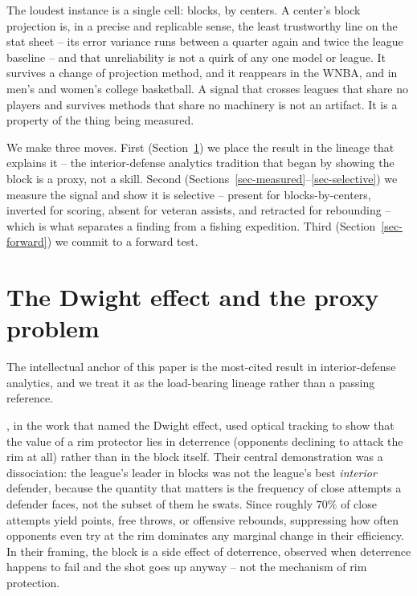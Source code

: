 \documentclass[11pt]{article}
\begin{document}
The loudest instance is a single cell: blocks, by centers. A center's block projection is, in a precise and replicable sense, the least trustworthy line on the stat sheet -- its error variance runs between a quarter again and twice the league baseline -- and that unreliability is not a quirk of any one model or league. It survives a change of projection method, and it reappears in the WNBA, and in men's and women's college basketball. A signal that crosses leagues that share no players and survives methods that share no machinery is not an artifact. It is a property of the thing being measured.

We make three moves. First (Section~\ref{sec-dwight}) we place the result in the lineage that explains it -- the interior-defense analytics tradition that began by showing the block is a proxy, not a skill. Second (Sections~\ref{sec-measured}--\ref{sec-selective}) we measure the signal and show it is selective -- present for blocks-by-centers, inverted for scoring, absent for veteran assists, and retracted for rebounding -- which is what separates a finding from a fishing expedition. Third (Section~\ref{sec-forward}) we commit to a forward test.

\section{The Dwight effect and the proxy problem}\label{sec-dwight}
The intellectual anchor of this paper is the most-cited result in interior-defense analytics, and we treat it as the load-bearing lineage rather than a passing reference.

\citet{goldsberry2013dwight}, in the work that named the Dwight effect, used optical tracking to show that the value of a rim protector lies in deterrence (opponents declining to attack the rim at all) rather than in the block itself. Their central demonstration was a dissociation: the league's leader in blocks was not the league's best \emph{interior} defender, because the quantity that matters is the frequency of close attempts a defender faces, not the subset of them he swats. Since roughly $70\%$ of close attempts yield points, free throws, or offensive rebounds, suppressing how often opponents even try at the rim dominates any marginal change in their efficiency. In their framing, the block is a side effect of deterrence, observed when deterrence happens to fail and the shot goes up anyway -- not the mechanism of rim protection.
\end{document}
